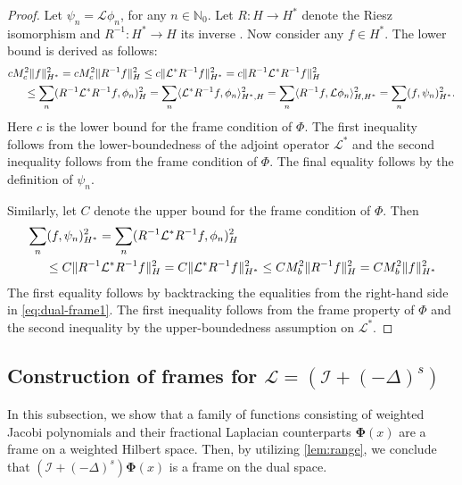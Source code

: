 \documentclass[10pt,a4paper]{article}
\numberwithin{equation}{section}
\begin{document}
\begin{proof}
Let $\psi_n = \mathcal{L}\phi_n$, for any $n \in \mathbb{N}_0$. Let $R : H \to H^*$ denote the Riesz isomorphism and $R^{-1} : H^* \to H$ its inverse \cite[Ch.~D.3, Th.~2]{Evans2010}. Now consider any $f \in H^*$. The lower bound is derived as follows: 
\begin{align}
\begin{split}
&c M_c^2\| f \|^2_{H^*} 	
= c M_c^2 \| R^{-1} f \|^2_H
\leq c \| \mathcal{L}^* R^{-1} f \|^2_{H^*}
 =  c \| R^{-1} \mathcal{L}^* R^{-1} f \|^2_{H}\\
& \indent \leq  \sum_{n} ( R^{-1} \mathcal{L}^* R^{-1} f, \phi_n)^2_{H}
 = \sum_{n} \langle \mathcal{L}^* R^{-1} f, \phi_n\rangle^2_{H^*,H}
 =  \sum_{n} \langle  R^{-1} f, \mathcal{L} \phi_n\rangle^2_{H,H^*}
=\sum_{n} (  f, \psi_n )^2_{H^*}.
\label{eq:dual-frame1}
\end{split}
\end{align} 
Here $c$ is the lower bound for the frame condition of $\Phi$.  The first inequality follows from the lower-boundedness of the adjoint operator $\mathcal{L}^*$ and the second inequality follows from the frame condition of $\Phi$. The final equality follows by the definition of $\psi_n$.

Similarly, let $C$ denote the upper bound for the frame condition of $\Phi$. Then
\begin{align}
\begin{split}
&\sum_{n} (  f, \psi_n )^2_{H^*}
= \sum_{n} ( R^{-1} \mathcal{L}^* R^{-1} f, \phi_n)^2_{H} \\
& \indent \leq C \| R^{-1} \mathcal{L}^* R^{-1} f \|^2_{H} 
= C \| \mathcal{L}^* R^{-1} f \|^2_{H^*} 
\leq C M_b^2 \| R^{-1} f \|^2_{H} 
= C M_b^2 \|  f \|^2_{H^*} 
\end{split}
\end{align}
The first equality follows by backtracking the equalities from the right-hand side in \cref{eq:dual-frame1}. The first inequality follows from the frame property of $\Phi$ and the second inequality by the upper-boundedness assumption on $\mathcal{L}^*$. 
\end{proof} 

\subsection{Construction of frames for $\mathcal{L} = (\mathcal{I} + (-\Delta)^s)$}

In this subsection, we show that a family of functions consisting of weighted Jacobi polynomials and their fractional Laplacian counterparts ${\bm \Phi}(x)$ are a frame on a weighted Hilbert space. Then, by utilizing \cref{lem:range}, we conclude that $(\mathcal{I} + (-\Delta)^s){\bm \Phi}(x)$ is a frame on the dual space.
\end{document}
